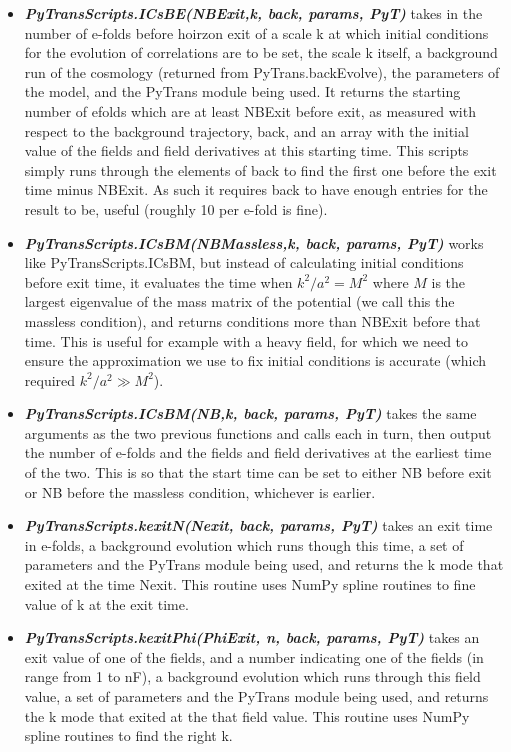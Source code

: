 \documentclass[10pt,
amsmath,amssymb,
aps,prd,nofootinbib,eqsecnum,a4paper]{revtex4}
\begin{document}
\begin{itemize}
\item   { \it \bf PyTransScripts.ICsBE(NBExit,k, back, params, PyT)} takes in the number of e-folds before hoirzon exit of a scale k at 
which initial conditions for the evolution of correlations are to be set, the scale k itself, a background run of the cosmology (returned from PyTrans.backEvolve), the parameters of the model, and the PyTrans module being used. It returns the starting number of efolds which are at least NBExit before exit, as measured with respect to the background trajectory, back, and an array with the initial value of the fields and field derivatives at this starting time. This scripts simply runs through the elements of back to find the first one before the exit time minus NBExit. As such 
it requires back to have enough entries for the result to be, 
useful (roughly 10 per e-fold is fine). 

\item { \it \bf PyTransScripts.ICsBM(NBMassless,k, back, params, PyT)} works like PyTransScripts.ICsBM, but instead of calculating initial conditions before 
exit time, it evaluates the time when $k^2/a^2 = M^2$ where $M$ is the largest eigenvalue of the mass matrix of the potential (we call this the massless condition), and returns conditions 
more than NBExit before that time. This is useful for example with a heavy field, for which we need to ensure the approximation we use to 
fix initial conditions is accurate (which required $k^2/a^2 \gg M^2$).

\item { \it \bf PyTransScripts.ICsBM(NB,k, back, params, PyT)}  takes the same arguments as the two previous 
functions and calls each in turn, then output the number of e-folds and the fields and field derivatives at the earliest time of the two. 
This is so that the start time can be set to either NB before exit or NB before the massless condition, whichever  is earlier.

\item { \it \bf PyTransScripts.kexitN(Nexit, back, params, PyT)} takes an exit time in e-folds, a background evolution which runs though this time,  
a set of parameters and the PyTrans module being used, and returns the k mode that exited at the time Nexit. This routine uses NumPy spline 
routines to fine value of k at the exit time.

\item { \it \bf PyTransScripts.kexitPhi(PhiExit, n, back, params, PyT)} takes an exit value of one of the fields, and a number indicating one of the fields (in range from 1 to nF), a background evolution which runs through this field value,  
a set of parameters and the PyTrans module being used, and returns the k mode that exited at the that field value. This routine uses NumPy spline routines to find the right k.


\end{itemize}
\end{document}
